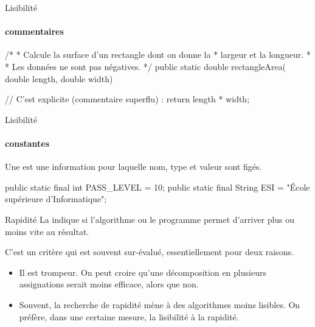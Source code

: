 \begin{hideedit}
\begin{frame}[fragile]{Lisibilité}
  \framesubtitle{commentaires}
  \begin{java}
/* 
 * Calcule la surface d'un rectangle dont on donne la
 * largeur et la longueur.
 * 
 * Les données ne sont pas négatives.
 */
public static double rectangleArea(
    double length, double width) {

  // C'est explicite (commentaire superflu) :
  return length * width;
}
  \end{java}
\end{frame}

\begin{frame}[fragile]{Lisibilité}
  \framesubtitle{constantes}
  Une  est une information pour laquelle nom, type et
  valeur sont figés.
  \vfill
  \begin{java}
public static final int PASS_LEVEL = 10;
public static final String ESI =
    "École supérieure d'Informatique";
  \end{java}
\end{frame}

\begin{frame}{Rapidité}
  La  indique si l’algorithme ou le programme permet
  d’arriver plus ou moins vite au résultat.

  \pause
  C’est un critère qui est souvent sur-évalué, 
  essentiellement pour deux raisons.
  \begin{itemize}[<+->]
    \item Il est trompeur. On peut croire qu'une décomposition en plusieurs
      assignations serait moins efficace, alors que non.
    \item Souvent, la recherche de rapidité mène à des algorithmes moins
      lisibles. On préfère, dans une certaine mesure, la lisibilité à la
      rapidité.
  \end{itemize}


\end{frame}
\end{hideedit}
